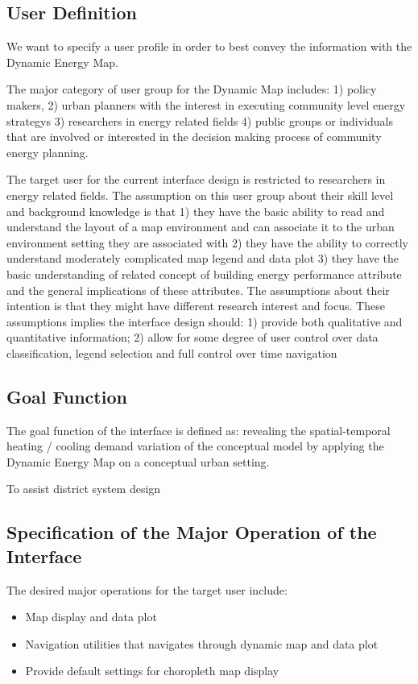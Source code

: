\documentclass[hidelinks,12pt]{article}
\begin{document}
\subsection{User Definition}
We want to specify a user profile in order to best convey the
information with the Dynamic Energy Map.

The major category of user group for the Dynamic Map includes: 1)
policy makers, 2) urban planners with the interest in executing
community level energy strategys 3) researchers in energy related
fields 4) public groups or individuals that are involved or interested
in the decision making process of community energy planning.

The target user for the current interface design is restricted to
researchers in energy related fields. The assumption on this user
group about their skill level and background knowledge is that 1) they
have the basic ability to read and understand the layout of a map
environment and can associate it to the urban environment setting they
are associated with 2) they have the ability to correctly understand
moderately complicated map legend and data plot 3) they have the basic
understanding of related concept of building energy performance
attribute and the general implications of these attributes. The
assumptions about their intention is that they might have different
research interest and focus. These assumptions implies the interface
design should: 1) provide both qualitative and quantitative
information; 2) allow for some degree of user control over data
classification, legend selection and full control over time navigation

\subsection{Goal Function}
The goal function of the interface is defined as: revealing the
spatial-temporal heating / cooling demand variation of the conceptual
model by applying the Dynamic Energy Map on a conceptual urban
setting.

To assist district system design

\subsection{Specification of the Major Operation of the Interface}

The desired major operations for the target user include: 
\begin{itemize}
\item Map display and data plot
\item Navigation utilities that navigates through dynamic map and data
  plot
\item Provide default settings for choropleth map display
\end{itemize}
\end{document}

